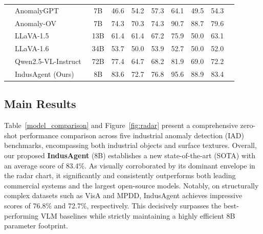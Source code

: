 \documentclass{article}
\begin{document}
\begin{table}[t]
{\begin{tabular}{l|lc|ccc|ccc|c}
& AnomalyGPT~\citep{gu2024anomalygpt} & 7B & 46.6 & 54.2 & 57.3  & 64.1 & 49.5 & 54.3 \\

& Anomaly-OV~\citep{xu2025towards} & 7B & 74.3 & \cellcolor{best}70.3 &\cellcolor{best} 74.3  & \cellcolor{best}90.7 & \cellcolor{best}88.7 & 79.6 \\
& LLaVA-1.5~\citep{liu2023llava15} & 13B & 61.4 & 61.4 & 67.2 & 75.9 & 50.0 & 63.1 \\
& LLaVA-1.6~\citep{liu2024llavanext} & 34B & 53.7 & 50.0 & 53.9  & 52.7 & 50.0 & 52.0 \\
& Qwen2.5-VL-Instruct~\cite{Qwen2.5-VL} & 72B & 77.4\cellcolor{best} & 64.7 & 68.2  & 81.9 & 69.0 & 72.2 \\
\midrule
\multirow{1}{*}{}
& IndusAgent (Ours) & 8B &\cellcolor{best2} 83.6 &\cellcolor{best2} 72.7 & \cellcolor{best2}76.8 & \cellcolor{best2}95.6 & \cellcolor{best2}88.9 & 83.4 \\
\bottomrule
\end{tabular}
}
\end{table}


\subsection{Main Results}


Table~\ref{model_comparison} and Figure~\ref{fig:radar} present a comprehensive zero-shot performance comparison across five industrial anomaly detection (IAD) benchmarks, encompassing both industrial objects and surface textures. Overall, our proposed \textbf{IndusAgent} (8B) establishes a new state-of-the-art (SOTA) with an average score of 83.4\%. As visually corroborated by its dominant envelope in the radar chart, it significantly and consistently outperforms both leading commercial systems and the largest open-source models. Notably, on structurally complex datasets such as VisA and MPDD, IndusAgent achieves impressive scores of 76.8\% and 72.7\%, respectively. This decisively surpasses the best-performing VLM baselines while strictly maintaining a highly efficient 8B parameter footprint. 

\end{document}
